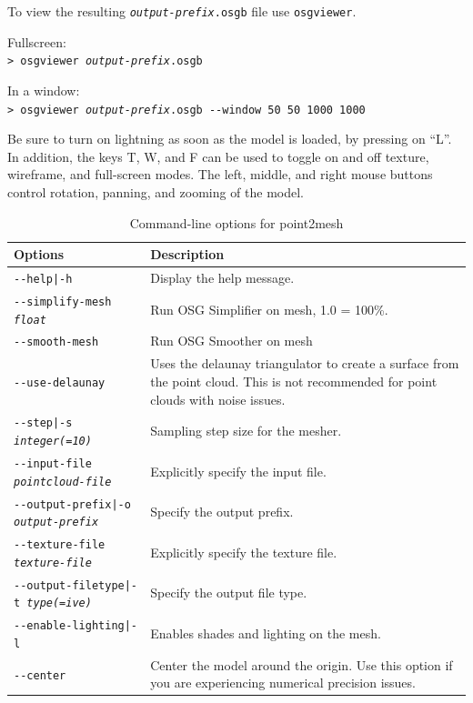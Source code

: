 To view the resulting \texttt{\textit{output-prefix}.osgb} file use
\texttt{osgviewer}.

\hspace*{2em}Fullscreen:\\
\hspace*{2em}\texttt{> osgviewer \textit{output-prefix}.osgb}

\hspace*{2em}In a window:\\
\hspace*{2em}\texttt{> osgviewer \textit{output-prefix}.osgb -\/-window 50 50 1000 1000}

Be sure to turn on lightning as soon as the model is loaded, by pressing on ``L''.
In addition, the keys T, W, and F can be used to toggle on
and off texture, wireframe, and full-screen modes.  The left, middle, and
right mouse buttons control rotation, panning, and zooming of the
model.

\begin{longtable}{|l|p{10cm}|}
\caption{Command-line options for point2mesh}
\label{tbl:point2mesh}
\endfirsthead
\endhead
\endfoot
\endlastfoot
\hline
Options & Description \\ \hline \hline
\texttt{-\/-help|-h} & Display the help message.\\ \hline
\texttt{-\/-simplify-mesh \textit{float}} & Run OSG Simplifier on mesh, 1.0 = 100\%. \\ \hline
\texttt{-\/-smooth-mesh} & Run OSG Smoother on mesh \\ \hline
\texttt{-\/-use-delaunay} & Uses the delaunay triangulator to create a surface from the point cloud. This is not recommended for point clouds with noise issues. \\ \hline
\texttt{-\/-step|-s \textit{integer(=10)}} & Sampling step size for the mesher. \\ \hline
\texttt{-\/-input-file \textit{pointcloud-file}} & Explicitly specify the input file. \\ \hline
\texttt{-\/-output-prefix|-o \textit{output-prefix}} & Specify the output prefix. \\ \hline
\texttt{-\/-texture-file \textit{texture-file}} & Explicitly specify the texture file. \\ \hline
\texttt{-\/-output-filetype|-t \textit{type(=ive)}} & Specify the output file type. \\ \hline
\texttt{-\/-enable-lighting|-l} & Enables shades and lighting on the mesh. \\ \hline
\texttt{-\/-center} & Center the model around the origin. Use this option if you are experiencing numerical precision issues. \\ \hline
\end{longtable}

